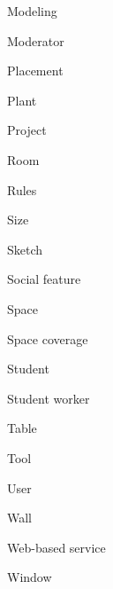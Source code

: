 \begin{paracol}{4}
\begin{compactitem}
				\item Modeling
				\item Moderator
				\item Placement
				\item Plant
				\item Project
				\item Room
				\item Rules
				\item Size
				\item Sketch
				\item Social feature
				\item Space
				\item Space coverage
				\item Student
				\item Student worker
				\item Table
				\item Tool
				\item User
				\item Wall
				\item Web-based service
				\item Window
			\end{compactitem}
			\switchcolumn
			

\end{paracol}
